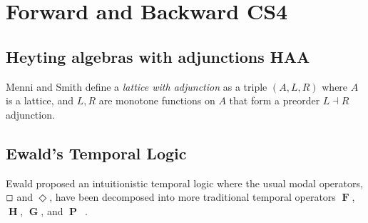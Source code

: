 \documentclass{article}
\renewcommand{\Box}{\oblong}
\newcommand{\F}{\mathop{\textbf{F}}}
\renewcommand{\P}{\mathop{\textbf{P}}}
\newcommand{\G}{\mathop{\textbf{G}}}
\renewcommand{\H}{\mathop{\textbf{H}}}
\begin{document}
\section{Forward and Backward CS4}


\subsection{Heyting algebras with adjunctions HAA}
Menni and Smith \cite{Menni:2014} define a \textit{lattice with
  adjunction} as a triple $(A, L, R)$ where $A$ is a lattice, and $L,
R$ are monotone functions on $A$ that form a preorder $L\dashv R$
adjunction.


\subsection{Ewald's Temporal Logic}

Ewald proposed an intuitionistic temporal logic where the usual modal
operators, $\Box$ and $\Diamond$, have been decomposed into more
traditional temporal operators $\F$, $\H$, $\G$, and
$\P$~\cite{ewald1986}.
\end{document}
